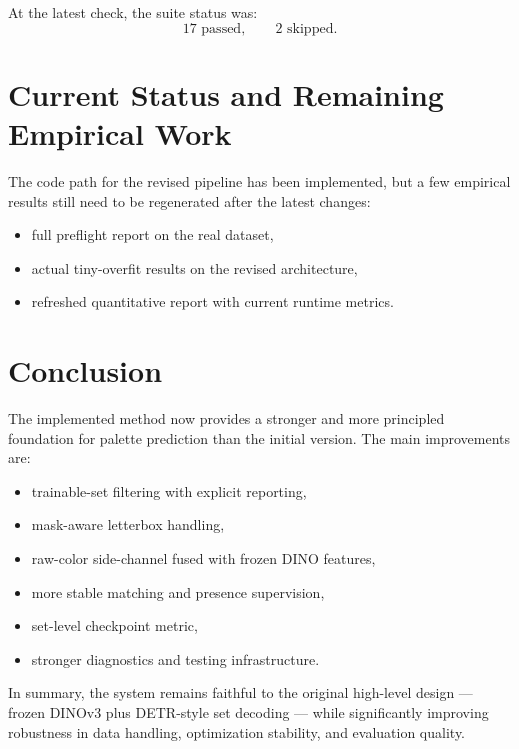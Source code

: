 \documentclass[11pt,a4paper]{article}
\begin{document}
At the latest check, the suite status was:
\begin{equation}
17 \text{ passed}, \qquad 2 \text{ skipped}.
\end{equation}

\section{Current Status and Remaining Empirical Work}

The code path for the revised pipeline has been implemented, but a few empirical results still need to be regenerated after the latest changes:
\begin{itemize}[leftmargin=2em]
    \item full preflight report on the real dataset,
    \item actual tiny-overfit results on the revised architecture,
    \item refreshed quantitative report with current runtime metrics.
\end{itemize}

\section{Conclusion}

The implemented method now provides a stronger and more principled foundation for palette prediction than the initial version. The main improvements are:
\begin{itemize}[leftmargin=2em]
    \item trainable-set filtering with explicit reporting,
    \item mask-aware letterbox handling,
    \item raw-color side-channel fused with frozen DINO features,
    \item more stable matching and presence supervision,
    \item set-level checkpoint metric,
    \item stronger diagnostics and testing infrastructure.
\end{itemize}

In summary, the system remains faithful to the original high-level design --- frozen DINOv3 plus DETR-style set decoding --- while significantly improving robustness in data handling, optimization stability, and evaluation quality.
\end{document}
